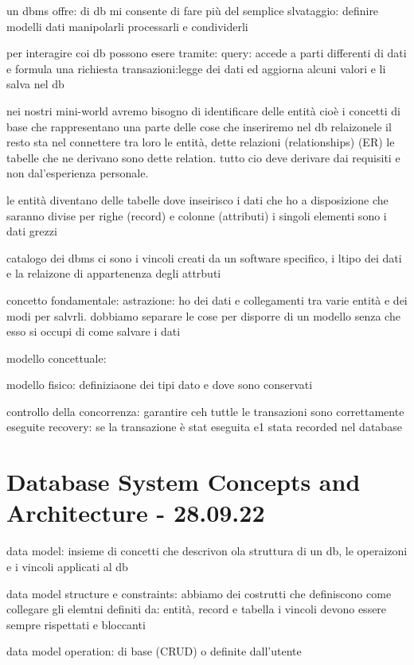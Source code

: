 un dbms offre:
di db mi consente di fare più del semplice slvataggio:
definire modelli dati
manipolarli
processarli e condividerli

per interagire coi db possono esere tramite:
query: accede a parti differenti di dati e formula una richiesta
transazioni:legge dei dati ed aggiorna alcuni valori e li salva nel db


nei nostri mini-world avremo bisogno di identificare delle entità cioè i concetti di base che rappresentano una parte delle cose che inseriremo nel db relaizonele il resto sta nel connettere tra loro le entità, dette relazioni (relationships) (ER) le tabelle che ne derivano sono dette relation. tutto cio deve derivare dai requisiti e non dal'esperienza personale.

le entità diventano delle tabelle dove inseirisco i dati che ho a disposizione che saranno divise per righe (record) e colonne (attributi) i singoli elementi sono i dati grezzi

catalogo dei dbms ci sono i vincoli creati da un software specifico, i ltipo dei dati e la relaizone di appartenenza degli attrbuti

concetto fondamentale: astrazione:
ho dei dati e collegamenti tra varie entità e dei modi per salvrli. dobbiamo separare le cose per disporre di un modello senza che esso si occupi di come salvare i dati

modello concettuale:

modello fisico: definiziaone dei tipi dato e dove sono conservati

controllo della concorrenza: garantire ceh tuttle le transazioni sono correttamente eseguite
recovery: se la transazione è stat eseguita e1 stata recorded nel database



\section{Database System Concepts and Architecture - 28.09.22}

data model: insieme di concetti che descrivon ola struttura di un db, le operaizoni e i vincoli applicati al db

data model structure e constraints: abbiamo dei costrutti che definiscono come collegare gli elemtni definiti da: entità, record e tabella
i vincoli devono essere sempre rispettati e bloccanti

data model operation: di base (CRUD) o definite dall'utente

